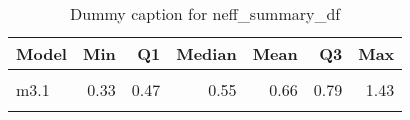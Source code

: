 \begin{table}
\centering
\caption{Dummy caption for neff_summary_df}
\centering
\fontsize{10}{12}\selectfont
\begin{tabular}[t]{lrrrrrr}
\toprule
Model & Min & Q1 & Median & Mean & Q3 & Max\\
\midrule
\cellcolor{gray!10}{m2} & \cellcolor{gray!10}{0.27} & \cellcolor{gray!10}{0.36} & \cellcolor{gray!10}{0.74} & \cellcolor{gray!10}{0.73} & \cellcolor{gray!10}{1.01} & \cellcolor{gray!10}{1.42}\\
m3.1 & 0.33 & 0.47 & 0.55 & 0.66 & 0.79 & 1.43\\
\cellcolor{gray!10}{m4} & \cellcolor{gray!10}{0.35} & \cellcolor{gray!10}{0.41} & \cellcolor{gray!10}{0.59} & \cellcolor{gray!10}{0.71} & \cellcolor{gray!10}{0.93} & \cellcolor{gray!10}{1.47}\\
\bottomrule
\end{tabular}
\end{table}
